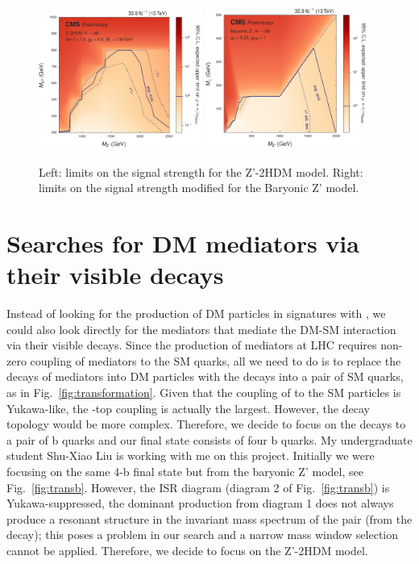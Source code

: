 \begin{figure}[htbp]
   \centering
   \includegraphics[width=0.475\textwidth]{limits_2hdm2d.png}
   \includegraphics[width=0.475\textwidth]{limits_barzp2d.png}
   \caption{Left: limits on the signal strength for the Z'-2HDM model. Right: limits on the signal strength modified for the Baryonic 
Z' model. }
   \label{fig:limits}
\end{figure}


\section{Searches for DM mediators via their visible decays}

Instead of looking for the production of DM particles in signatures with \ptvecmiss, we could also look directly for the mediators 
that mediate the DM-SM interaction via their visible decays. Since the production of mediators at LHC requires non-zero coupling of 
mediators to the SM quarks, all we need to do is to replace the decays of mediators into DM particles with the decays into a pair of 
SM quarks, as in Fig.~\ref{fig:transformation}. Given that the coupling of \Az to the SM particles is Yukawa-like, the \Az-top 
coupling is actually the largest. However, the decay topology would be more complex. Therefore, we decide to focus on the decays to 
a pair of b quarks and our final state consists of four b quarks. My undergraduate student Shu-Xiao Liu is working with me on this 
project. Initially we were focusing on the same 4-b final state but from the baryonic Z' model, see Fig.~\ref{fig:transb}. However, 
the ISR diagram (diagram 2 of Fig.~\ref{fig:transb}) is Yukawa-suppressed, the dominant production from diagram 1 does not always 
produce a resonant structure in the invariant mass spectrum of the \cPqb\cPaqb pair (from the \cPZpr decay); this poses a problem 
in our search and a narrow mass window selection cannot be applied. Therefore, we decide to focus on the Z'-2HDM model. 

